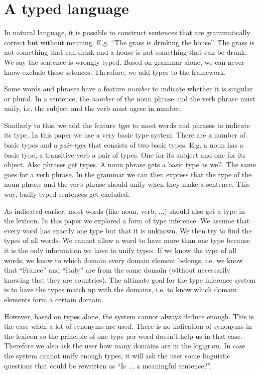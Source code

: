 \section{A typed language}
In natural language, it is possible to construct sentences that are grammatically correct but without meaning. E.g. ``The grass is drinking the house''. The grass is not something that can drink and a house is not something that can be drunk. We say the sentence is wrongly typed. Based on grammar alone, we can never know exclude these setences. Therefore, we add types to the framework.

Some words and phrases have a feature \textit{number} to indicate whether it is singular or plural. In a sentence, the \textit{number} of the noun phrase and the verb phrase must unify, i.e. the subject and the verb must agree in number.

Similarly to this, we add the feature \textit{type} to most words and phrases to indicate its type. In this paper we use a very basic type system. There are a number of basic types and a \textit{pair-type} that consists of two basic types. E.g. a noun has a basic type, a transitive verb a pair of types. One for its subject and one for its object. Also phrases get types. A noun phrase gets a basic type as well. The same goes for a verb phrase. In the grammar we can then express that the type of the noun phrase and the verb phrase should unify when they make a sentence. This way, badly typed sentences get excluded.

As indicated earlier, most words (like noun, verb, ...) should also get a type in the lexicon. In this paper we explored a form of type inference. We assume that every word has exactly one type but that it is unknown. We then try to find the types of all words. We cannot allow a word to have more than one type because it is the only information we have to unify types. If we know the type of all words, we know to which domain every domain element belongs, i.e. we know that ``France'' and ``Italy'' are from the same domain (without necessarily knowing that they are countries). The ultimate goal for the type inference system is to have the types match up with the domains, i.e. to know which domain elements form a certain domain.

However, based on types alone, the system cannot always deduce enough. This is the case when a lot of synonyms are used. There is no indication of synonyms in the lexicon so the principle of one type per word doesn't help us in that case. Therefore we also ask the user how many domains are in the logigram. In case the system cannot unify enough types, it will ask the user some linguistic questions that could be rewritten as ``Is ... a meaningful sentence?''.

